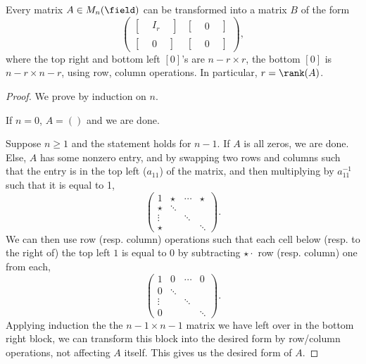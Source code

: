 \begin{theorem}\label{thm:blockformable}
    Every matrix $A \in M_{n}(\field)$ can be transformed into a matrix $B$ of the form \[
    \begin{pmatrix}
        \begin{bmatrix}
           &I_r &
        \end{bmatrix} & \begin{bmatrix}
            & 0 & 
        \end{bmatrix}\\
        \begin{bmatrix}
            & 0 &
        \end{bmatrix} & \begin{bmatrix}
            & 0 &
        \end{bmatrix}
    \end{pmatrix}, 
    \]
    where the top right and bottom left $[0]$'s are $n - r \times r$, the bottom $[0]$ is $n - r \times n - r$, using row, column operations. In particular, $r = \rank(A)$.
\end{theorem}
\begin{proof}
    We prove by induction on $n$. 
    
     If $n = 0$, $A = ()$ and we are done.

     Suppose $n \geq 1$ and the statement holds for $n - 1$. If $A$ is all zeros, we are done. Else, $A$ has some nonzero entry, and by swapping two rows and columns such that the entry is in the top left ($a_11$) of the matrix, and then multiplying by $a_11^{-1}$ such that it is equal to 1, \[
    \begin{pmatrix}
        1 & \star & \cdots & \star\\
        \star & \ddots & & \\
        \vdots & & \ddots &\\
        \star & & & \ddots
    \end{pmatrix}.
    \]
    We can then use row (resp. column) operations such that each cell below (resp. to the right of) the top left $1$ is equal to $0$ by subtracting $\star \cdot $ row (resp. column) one from each,
    \[
        \begin{pmatrix}
            1 & 0 & \cdots & 0\\
            0 & \ddots & & \\
            \vdots & & \ddots &\\
            0 & & & \ddots
        \end{pmatrix}.
        \]
        Applying induction the the $n - 1 \times n - 1$ matrix we have left over in the bottom right block, we can transform this block into the desired form by row/column operations, not affecting $A$ itself. This gives us the desired form of $A$.
\end{proof}

